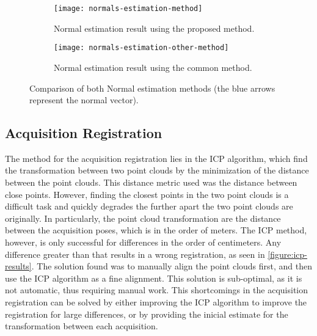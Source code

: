 \begin{figure}[h]
    
    \centering
    \begin{subfigure}[t]{\textwidth}
        \centering
        \texttt{[image: normals-estimation-method]}
        \caption{Normal estimation result using the proposed method.}
        \label{figure:normals-estimation-method}
    \end{subfigure}

    \begin{subfigure}[t]{\textwidth}
        \centering
        \texttt{[image: normals-estimation-other-method]}
        \caption{Normal estimation result using the common method.}
        \label{figure:normals-estimation-other-method}
    \end{subfigure}

    \caption{Comparison of both Normal estimation methods (the blue arrows represent the normal vector).}
    \label{figure:normal-estimation-results}

\end{figure}

\subsection{Acquisition Registration}

The method for the acquisition registration lies in the ICP algorithm, which find the transformation between two point clouds by the minimization of the distance between the point clouds. This distance metric used was the distance between close points. However, finding the closest points in the two point clouds is a difficult task and quickly degrades the further apart the two point clouds are originally. In particularly, the point cloud transformation are the distance between the acquisition poses, which is in the order of meters. The ICP method, however, is only successful for differences in the order of centimeters. Any difference greater than that results in a wrong registration, as seen in \cref{figure:icp-results}. The solution found was to manually align the point clouds first, and then use the ICP algorithm as a fine alignment. This solution is sub-optimal, as it is not automatic, thus requiring manual work. This shortcomings in the acquisition registration can be solved by either improving the ICP algorithm to improve the registration for large differences, or by providing the inicial estimate for the transformation between each acquisition.

